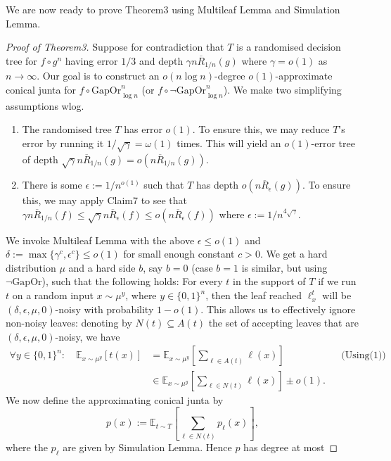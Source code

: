 \documentclass[10pt,a4paper]{article}
\begin{document}
We are now ready to prove Theorem3 using Multileaf Lemma and Simulation Lemma.
\begin{proof}[Proof of Theorem3]
Suppose for contradiction that $T$ is a randomised decision tree for $f\circ g^n$ having error $1/3$ and depth $\gamma n\overline R_{1/n}(g)$ where $\gamma=o(1)$ as $n\to\infty$. Our goal is to construct an $o(n\log n)$-degree $o(1)$-approximate conical junta for $f\circ\mathrm{GapOr}_{\log n}^n$ (or $f\circ\neg\mathrm{GapOr}_{\log n}^n$).
We make two simplifying assumptions wlog.
\begin{enumerate}
\item The randomised tree $T$ has error $o(1)$. To ensure this, we may reduce $T$'s error by running it $1/\sqrt\gamma=\omega(1)$ times. This will yield an $o(1)$-error tree of depth $\sqrt\gamma n\overline R_{1/n}(g)=o(n\overline R_{1/n}(g))$.
\item There is some $\epsilon:=1/n^{o(1)}$ such that $T$ has depth $o(n\overline R_\epsilon(g))$. To ensure this, we may apply Claim7 to see that $\gamma n\overline R_{1/n}(f)\le\sqrt\gamma n\overline R_\epsilon(f)\le o(n\overline R_\epsilon(f))$ where $\epsilon:=1/n^{4\sqrt\gamma}$.
\end{enumerate}
We invoke Multileaf Lemma with the above $\epsilon\le o(1)$ and $\delta:=\max\{\gamma^c,\epsilon^c\}\le o(1)$ for small enough constant $c>0$. We get a hard distribution $\mu$ and a hard side $b$, say $b=0$ (case $b=1$ is similar, but using $\neg\mathrm{GapOr}$), such that the following holds: For every $t$ in the support of $T$ if we run $t$ on a random input $x\sim\mu^y$, where $y\in\{0,1\}^n$, then the leaf reached $\ell_x^t$ will be $(\delta,\epsilon,\mu,0)$-noisy with probability $1-o(1)$. This allows us to effectively ignore non-noisy leaves: denoting by $N(t)\subseteq A(t)$ the set of accepting leaves that are $(\delta,\epsilon,\mu,0)$-noisy, we have
\begin{equation}\tag{2}
\begin{aligned}
\forall y\in\{0,1\}^n:\quad\mathbb E_{x\sim\mu^y}[t(x)]
&=\mathbb E_{x\sim\mu^y}\left[\sum_{\ell\in A(t)}\ell(x)\right]&&\text{(Using(1))}\\
&\in\mathbb E_{x\sim\mu^y}\left[\sum_{\ell\in N(t)}\ell(x)\right]\pm o(1).
\end{aligned}
\end{equation}
We now define the approximating conical junta by
\[p(x):=\mathbb E_{t\sim T}\left[\sum_{\ell\in N(t)}p_\ell(x)\right],\]
where the $p_\ell$ are given by Simulation Lemma. Hence $p$ has degree at most

\end{proof}
\end{document}
